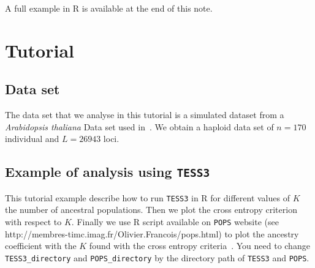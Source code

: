 \documentclass[10pt,a4paper]{article}
\begin{document}
\noindent
A full example in R is available at the end of this note.



\section{Tutorial}

\subsection{Data set}
The data set that we analyse in this tutorial is a simulated dataset from a {\it Arabidopsis thaliana} Data set used in~\cite{atwell2010genome}. We obtain a haploid data set of $n = 170$ individual and $L = 26943$ loci.

\subsection{Example of analysis using {\tt TESS3}}

This tutorial example describe how to run {\tt TESS3} in R for different values of $K$ the number of ancestral populations. Then we plot the cross entropy criterion with respect to $K$. Finally we use R script available on {\tt POPS} website (see http://membres-timc.imag.fr/Olivier.Francois/pops.html) to plot the ancestry coefficient with the $K$ found with the cross entropy criteria~\cite{jay2012forecasting}. You need to change \verb|TESS3_directory| and \verb|POPS_directory| by the directory path of {\tt TESS3} and {\tt POPS}.
\end{document}
